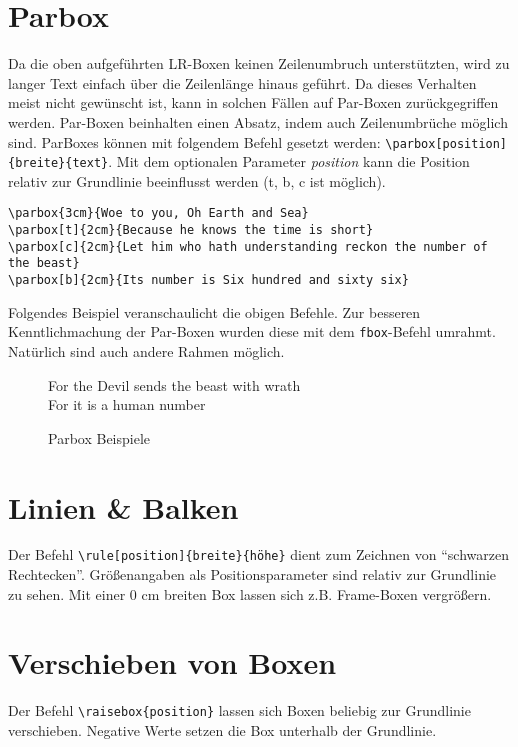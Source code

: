 \section{Parbox}
Da die oben aufgeführten LR-Boxen keinen Zeilenumbruch unterstützten, wird zu langer Text einfach über die Zeilenlänge hinaus geführt. Da dieses Verhalten meist nicht gewünscht ist, kann in solchen Fällen auf Par-Boxen zurückgegriffen werden. Par-Boxen beinhalten einen Absatz, indem auch Zeilenumbrüche möglich sind. ParBoxes können mit folgendem Befehl gesetzt werden: \verb=\parbox[position]{breite}{text}=. Mit dem optionalen Parameter \textit{position} kann die Position relativ zur Grundlinie beeinflusst werden (t, b, c ist möglich).
\begin{lstlisting}[caption={Parbox Befehle}, escapechar=$] 
\parbox{3cm}{Woe to you, Oh Earth and Sea}
\parbox[t]{2cm}{Because he knows the time is short}
\parbox[c]{2cm}{Let him who hath understanding reckon the number of the beast}
\parbox[b]{2cm}{Its number is Six hundred and sixty six}
\end{lstlisting}
Folgendes Beispiel veranschaulicht die obigen Befehle. Zur besseren Kenntlichmachung der Par-Boxen wurden diese mit dem \verb=fbox=-Befehl umrahmt. Natürlich sind auch andere Rahmen möglich.
\begin{figure}[H]
 For the Devil sends the beast with wrath \\
 For it is a human number 
\caption{Parbox Beispiele}
\end{figure}
\section{Linien \& Balken}
Der Befehl \verb=\rule[position]{breite}{höhe}= dient zum Zeichnen von ``schwarzen Rechtecken''. Größenangaben als Positionsparameter sind relativ zur Grundlinie zu sehen. Mit einer 0 cm breiten Box lassen sich z.B. Frame-Boxen vergrößern. 
\section{Verschieben von Boxen}
Der Befehl \verb=\raisebox{position}= lassen sich Boxen beliebig zur Grundlinie verschieben. Negative Werte setzen die Box unterhalb der Grundlinie.